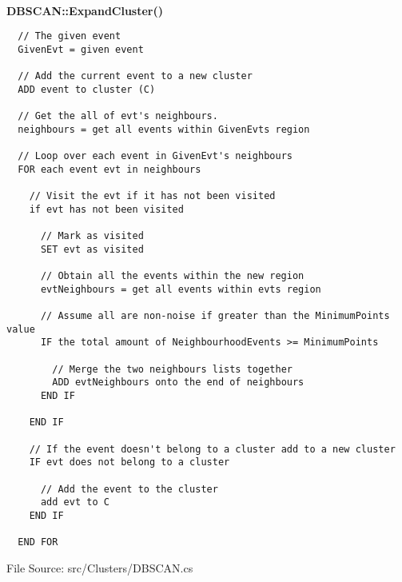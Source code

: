 ~\\
{\bfseries DBSCAN::ExpandCluster()}
\lstset{style=pseudocode}
\begin{lstlisting}
  // The given event
  GivenEvt = given event

  // Add the current event to a new cluster
  ADD event to cluster (C)

  // Get the all of evt's neighbours.
  neighbours = get all events within GivenEvts region

  // Loop over each event in GivenEvt's neighbours
  FOR each event evt in neighbours

    // Visit the evt if it has not been visited
    if evt has not been visited

      // Mark as visited
      SET evt as visited
      
      // Obtain all the events within the new region
      evtNeighbours = get all events within evts region

      // Assume all are non-noise if greater than the MinimumPoints value
      IF the total amount of NeighbourhoodEvents >= MinimumPoints

        // Merge the two neighbours lists together
        ADD evtNeighbours onto the end of neighbours
      END IF

    END IF

    // If the event doesn't belong to a cluster add to a new cluster
    IF evt does not belong to a cluster

      // Add the event to the cluster
      add evt to C
    END IF

  END FOR
\end{lstlisting}
{\textsf \footnotesize File Source: src/Clusters/DBSCAN.cs }
